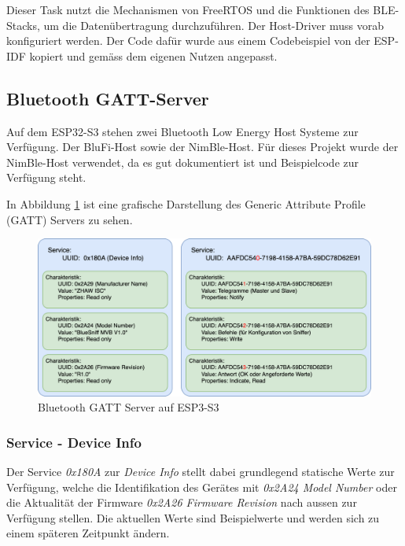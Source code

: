Dieser Task nutzt die Mechanismen von FreeRTOS und die Funktionen des BLE-Stacks, um die Datenübertragung durchzuführen. Der Host-Driver muss vorab konfiguriert werden. Der Code dafür wurde aus einem Codebeispiel von der ESP-IDF kopiert und gemäss dem eigenen Nutzen angepasst. \cite{BLUETOOTH_EXAMPLE_GATT}



\subsection{Bluetooth GATT-Server}
\label{sub:BluetoothGATT}
Auf dem ESP32-S3 stehen zwei Bluetooth Low Energy Host Systeme zur Verfügung. Der BluFi-Host sowie der NimBle-Host\cite{BLUETOOTH_API}. Für dieses Projekt wurde der NimBle-Host verwendet, da es gut dokumentiert ist und Beispielcode zur Verfügung steht.

In Abbildung \ref{fig:BLEGATT} ist eine grafische Darstellung des Generic Attribute Profile (GATT) Servers zu sehen.

\begin{figure}[H]
    \centering
    \includegraphics[width=0.9\linewidth]{Figures/Chap3/ESP/BLE/BLE.png}
    \caption{Bluetooth GATT Server auf ESP3-S3}
    \label{fig:BLEGATT}
\end{figure}

\subsubsection{Service - Device Info}
Der Service \textit{0x180A} zur \textit{Device Info} stellt dabei grundlegend statische Werte zur Verfügung, welche die Identifikation des Gerätes mit \textit{0x2A24 Model Number} oder die Aktualität der Firmware \textit{0x2A26 Firmware Revision} nach aussen zur Verfügung stellen. Die aktuellen Werte sind Beispielwerte und werden sich zu einem späteren Zeitpunkt ändern. 

